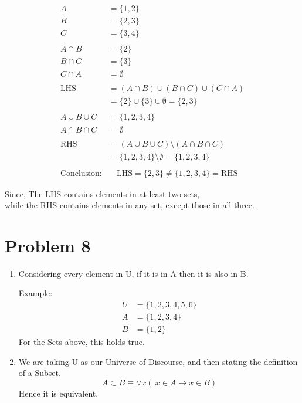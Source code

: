 \documentclass{article}
\begin{document}
\begin{enumerate}
    \begin{align*}
    A &= \{1, 2\} \\
    B &= \{2, 3\} \\
    C &= \{3, 4\} \\
    \\
    A \cap B &= \{2\} \\
    B \cap C &= \{3\} \\
    C \cap A &= \emptyset \\
    \\
    \text{LHS} &= (A \cap B) \cup (B \cap C) \cup (C \cap A) \\
            &= \{2\} \cup \{3\} \cup \emptyset = \{2, 3\} \\
    \\
    A \cup B \cup C &= \{1, 2, 3, 4\} \\
    A \cap B \cap C &= \emptyset \\
    \\
    \text{RHS} &= (A \cup B \cup C) \setminus (A \cap B \cap C) \\
            &= \{1, 2, 3, 4\} \setminus \emptyset = \{1, 2, 3, 4\} \\
    \\
    \text{Conclusion:} &\quad \text{LHS} = \{2, 3\} \ne \{1, 2, 3, 4\} = \text{RHS}
    \end{align*}

    Since, The LHS contains elements in at least two sets, \\
    while the RHS contains elements in any set, except those in all three.

\end{enumerate}

\section*{Problem 8}
\begin{enumerate}
    \item %
    
    Considering every element in U, if it is in A then it is also in B.

    Example:
    \begin{align*}
    U &= \{1, 2, 3, 4, 5, 6\} \\
    A &= \{1, 2, 3, 4\} \\
    B &= \{1, 2\}
    \end{align*}
    For the Sets above, this holds true.

    \item %
    We are taking U as our Universe of Discourse, and then stating the definition of a Subset.
    \[
    A \subset B \equiv \forall x (\ x \in A \to x \in B)
    \]
    Hence it is equivalent.
    
\end{enumerate}
\end{document}
